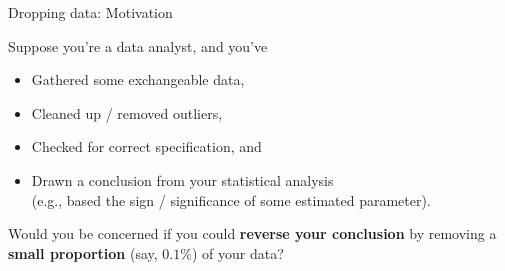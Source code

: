 \begin{frame}{Dropping data: Motivation}

Suppose you're a data analyst, and you've

\begin{itemize}
    \item Gathered some exchangeable data,
    \item Cleaned up / removed outliers,
    \item Checked for correct specification, and
    \item Drawn a conclusion from your statistical analysis \\(e.g., based
    the sign / significance of some estimated parameter).
\end{itemize}

\pause
\vspace{1em}
Would you be concerned if you could \textbf{reverse your conclusion} by removing
a \textbf{small proportion} (say, $0.1\%$) of your data?

\end{frame}


